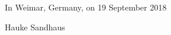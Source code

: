 \documentclass[oneside]{tutthesis} %
\begin{document}
\vspace{2\baselineskip}

In Weimar, Germany, on 19 September 2018

\vspace{2\baselineskip}

Hauke Sandhaus



\tableofcontents

\listoffigures





















\end{document}

